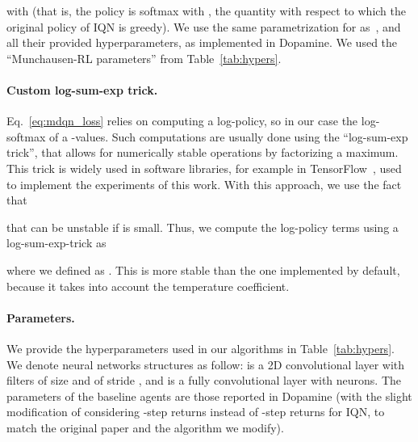 \documentclass{article}
\begin{document}
with  (that is, the policy is softmax with , the quantity with respect to which the original policy of IQN is greedy). We use the same parametrization for  as~\citet{dabney2018implicit}, and all their provided hyperparameters, as implemented in Dopamine. We used the ``Munchausen-RL parameters'' from Table~\ref{tab:hypers}.

\paragraph{Custom log-sum-exp trick.}
Eq.~\ref{eq:mdqn_loss} relies on computing a log-policy, so in our case the log-softmax of a -values. Such computations are usually done using the ``log-sum-exp trick'', that allows for numerically stable operations by factorizing a maximum. This trick is widely used in software libraries, for example in TensorFlow~\cite{tensorflow2015-whitepaper}, used to implement the experiments of this work. With this approach, we use the fact that

that can be unstable if  is small. Thus, we compute the log-policy terms using a log-sum-exp-trick as

where we defined  as . This is more stable than the one implemented by default, because it takes into account the temperature coefficient.


\paragraph{Parameters.}
We provide the hyperparameters used in our algorithms in Table~\ref{tab:hypers}. We denote neural networks structures as follow:  is a 2D convolutional layer with  filters of size  and of stride , and  is a fully convolutional layer with  neurons. The parameters of the baseline agents are those reported in Dopamine (with the slight modification of considering -step returns instead of -step returns for IQN, to match the original paper and the algorithm we modify).
\end{document}
